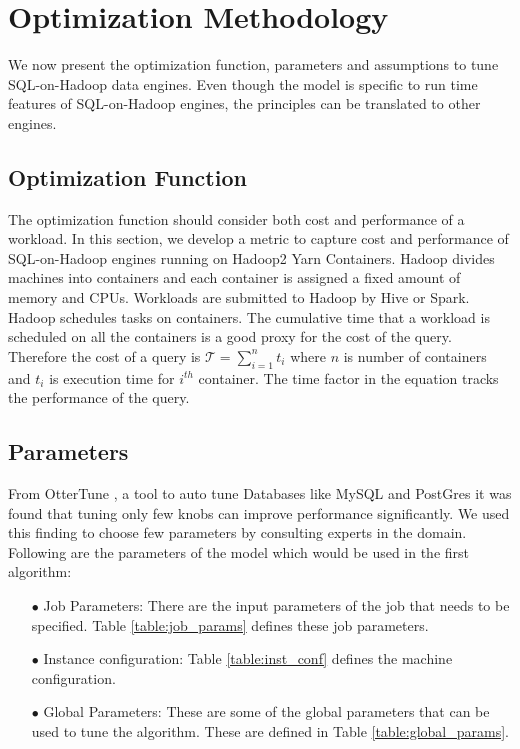 \section{Optimization Methodology}
We now present the optimization function, parameters and assumptions to tune SQL-on-Hadoop data engines. Even though the model is specific to run time features of SQL-on-Hadoop engines, the principles can be translated to other engines. 

\subsection{Optimization Function}
The optimization function should consider both cost and performance of a workload. In this section, we develop a metric to capture cost and performance of SQL-on-Hadoop engines running on Hadoop2 Yarn Containers. Hadoop divides machines into containers and each container is assigned a fixed amount of memory and CPUs. Workloads are submitted to Hadoop by Hive or Spark. Hadoop schedules tasks on containers. 
The cumulative time that a workload is scheduled on all the containers is a good proxy for the cost of the query. Therefore the cost of a query is $\mathcal{T} = \sum_{i=1}^{n} t_i$ where $n$ is number of containers and $t_i$ is execution time for $i^{th}$ container. The time factor in the equation tracks the performance of the query.

\subsection{Parameters}
From OtterTune \cite{VanKen}, a tool to auto tune Databases like MySQL and PostGres it was found that tuning only few knobs can improve performance significantly. We used this finding to choose few parameters by consulting experts in the domain. Following are the parameters of the model which would be used in the first algorithm:
\begin{enumerate}
    \item[$\bullet$] Job Parameters: There are the input parameters of the job that needs to be specified. Table \ref{table:job_params} defines these job parameters.
    \item[$\bullet$] Instance configuration: Table \ref{table:inst_conf} defines the machine configuration.
    \item[$\bullet$] Global Parameters: These are some of the global parameters that can be used to tune the algorithm. These are defined in Table \ref{table:global_params}.
\end{enumerate}

